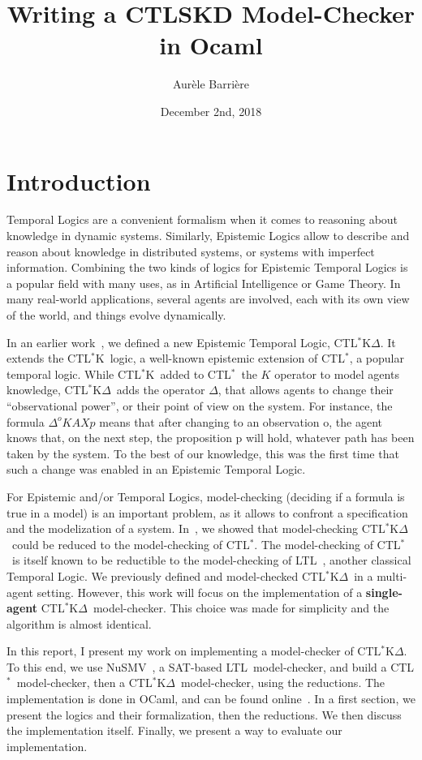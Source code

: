 \documentclass[dvipsnames]{acmart}
\title{Writing a CTLSKD Model-Checker in Ocaml}
\author{Aur\`ele Barri\`ere}
\date{December 2nd, 2018}
\def\ctls{CTL$^{*}$}
\def\ctlsk{CTL$^{*}$K}
\def\ctlskd{CTL$^{*}$K$\Delta$}
\def\ltl{LTL}
\def\A{\mathit{A}}
\def\X{\mathit{X}}
\def\K{\mathit{K}}
\def\D#1{\Delta^{#1}}
\begin{document}
\maketitle

\section{Introduction}

Temporal Logics are a convenient formalism when it comes to reasoning about knowledge in dynamic systems.
Similarly, Epistemic Logics allow to describe and reason about knowledge in distributed systems, or systems with imperfect information.
Combining the two kinds of logics for Epistemic Temporal Logics is a popular field with many uses, as in Artificial Intelligence or Game Theory.
In many real-world applications, several agents are involved, each with its own view of the world, and things evolve dynamically.

In an earlier work~\cite{internship}, we defined a new Epistemic Temporal Logic, \ctlskd.
It extends the \ctlsk\ logic, a well-known epistemic extension of \ctls, a popular temporal logic.
While \ctlsk\ added to \ctls\ the $\K$ operator to model agents knowledge, \ctlskd\ adds the operator $\Delta$, that allows agents to change their ``observational power'', or their point of view on the system.
For instance, the formula $\D{o}\K\A\X p$ means that after changing to an observation o, the agent knows that, on the next step, the proposition p will hold, whatever path has been taken by the system.
To the best of our knowledge, this was the first time that such a change was enabled in an Epistemic Temporal Logic.

For Epistemic and/or Temporal Logics, model-checking (deciding if a formula is true in a model) is an important problem, as it allows to confront a specification and the modelization of a system.
In~\cite{internship}, we showed that model-checking \ctlskd\ could be reduced to the model-checking of \ctls. The model-checking of \ctls\ is itself known to be reductible to the model-checking of \ltl ~\cite{reduction}, another classical Temporal Logic.
We previously defined and model-checked \ctlskd\ in a multi-agent setting. However, this work will focus on the implementation of a \textbf{single-agent} \ctlskd\ model-checker. This choice was made for simplicity and the algorithm is almost identical.

In this report, I present my work on implementing a model-checker of \ctlskd. To this end, we use NuSMV~\cite{nusmv_paper}, a SAT-based \ltl\ model-checker, and build a \ctls\ model-checker, then a  \ctlskd\ model-checker, using the reductions.
The implementation is done in OCaml, and can be found online~\cite{ctlskd_mc}. In a first section, we present the logics and their formalization, then the reductions. We then discuss the implementation itself. Finally, we present a way to evaluate our implementation.
\end{document}
